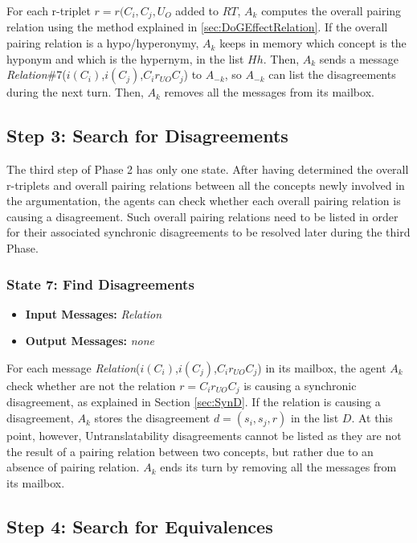 For each r-triplet $r = r(C_{i}, C_{j}, U_{O}$ added to $RT$, $A_{k}$ computes the overall pairing relation using the method explained in \ref{sec:DoGEffectRelation}. If the overall pairing relation is a hypo/hyperonymy, $A_{k}$ keeps in memory which concept is the hyponym and which is the hypernym, in the list $Hh$. Then, $A_{k}$ sends a message \emph{Relation}\#7($i(C_{i})$,$i(C_{j})$,$C_{i} r_{UO} C_{j}$) to $A_{-k}$, so $A_{-k}$ can list the disagreements during the next turn. Then, $A_{k}$ removes all the messages from its mailbox.

\subsection{Step 3: Search for Disagreements}

The third step of Phase 2 has only one state. After having determined the overall r-triplets and overall pairing relations between all the concepts newly involved in the argumentation, the agents can check whether each overall pairing relation is causing a disagreement. Such overall pairing relations need to be listed in order for their associated synchronic disagreements to be resolved later during the third Phase.

\subsubsection{State 7: Find Disagreements}

\begin{itemize}
    \item \textbf{Input Messages:} \emph{Relation}
    \item \textbf{Output Messages:} \emph{none}
\end{itemize}

For each message \emph{Relation}($i(C_{i})$,$i(C_{j})$,$C_{i} r_{UO} C_{j}$) in its mailbox, the agent $A_{k}$ check whether are not the relation $r = C_{i} r_{UO} C_{j}$ is causing a synchronic disagreement, as explained in Section \ref{sec:SynD}. If the relation is causing a disagreement, $A_{k}$ stores the disagreement $d = (s_{i}, s_{j}, r)$ in the list $D$. At this point, however, Untranslatability disagreements cannot be listed as they are not the result of a pairing relation between two concepts, but rather due to an absence of pairing relation. $A_{k}$ ends its turn by removing all the messages from its mailbox. 

\subsection{Step 4: Search for Equivalences}


